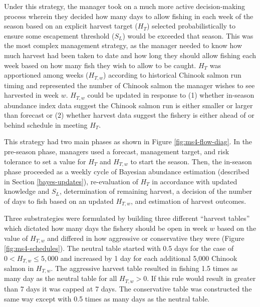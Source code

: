 \documentclass[12pt,]{book}
\theoremstyle{definition}
\theoremstyle{definition}
\theoremstyle{definition}
\theoremstyle{remark}
\begin{document}
\noindent
Under this strategy, the manager took on a much more active
decision-making process wherein they decided how many days to allow
fishing in each week of the season based on an explicit harvest target
(\(H_T\)) selected probabilistically to ensure some escapement threshold
(\(S_L\)) would be exceeded that season. This was the most complex
management strategy, as the manager needed to know how much harvest had
been taken to date and how long they should allow fishing each week
based on how many fish they wish to allow to be caught. \(H_T\) was
apportioned among weeks (\(H_{T,w}\)) according to historical Chinook
salmon run timing and represented the number of Chinook salmon the
manager wishes to see harvested in week \(w\). \(H_{T,w}\) could be
updated in response to (1) whether in-season abundance index data
suggest the Chinook salmon run is either smaller or larger than forecast
or (2) whether harvest data suggest the fishery is either ahead of or
behind schedule in meeting \(H_T\).

This strategy had two main phases as shown in Figure
\ref{fig:ms4-flow-diag}. In the pre-season phase, managers used a
forecast, management target, and risk tolerance to set a value for
\(H_T\) and \(H_{T,w}\) to start the season. Then, the in-season phase
proceeded as a weekly cycle of Bayesian abundance estimation (described
in Section \ref{bayes-updates}), re-evaluation of \(H_T\) in accordance
with updated knowledge and \(S_L\), determination of remaining harvest,
a decision of the number of days to fish based on an updated
\(H_{T,w}\), and estimation of harvest outcomes.

Three substrategies were formulated by building three different
``harvest tables'' which dictated how many days the fishery should be
open in week \(w\) based on the value of \(H_{T,w}\) and differed in how
aggressive or conservative they were (Figure \ref{fig:ms4-schedules}).
The neutral table started with 0.5 days for the case of
\(0 < H_{T,w} \le 5,000\) and increased by 1 day for each additional
5,000 Chinook salmon in \(H_{T,w}\). The aggressive harvest table
resulted in fishing 1.5 times as many day as the neutral table for all
\(H_{T,w} > 0\). If this rule would result in greater than 7 days it was
capped at 7 days. The conservative table was constructed the same way
except with 0.5 times as many days as the neutral table.
\end{document}
